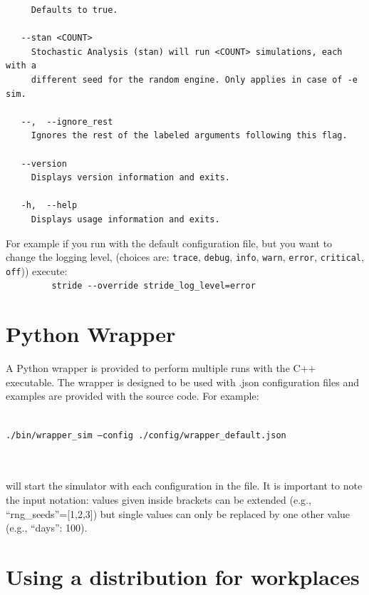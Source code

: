 \begin{verbatim}
     Defaults to true.
 
   --stan <COUNT>
     Stochastic Analysis (stan) will run <COUNT> simulations, each with a
     different seed for the random engine. Only applies in case of -e sim.
 
   --,  --ignore_rest
     Ignores the rest of the labeled arguments following this flag.
 
   --version
     Displays version information and exits.
 
   -h,  --help
     Displays usage information and exits.

\end{verbatim}

For example if you run with the default configuration file, but you
want to change the logging level,
(choices are: \texttt{trace}, \texttt{debug}, \texttt{info}, \texttt{warn},
\texttt{error}, \texttt{critical}, \texttt{off})) execute:\\
\verb!         stride --override stride_log_level=error!


\section{Python Wrapper}
A Python wrapper is provided to perform multiple runs with the C++ executable.
The wrapper is designed to be used with .json configuration files and examples are provided with the source code.
For example: \\ \\
\centerline{\texttt{./bin/wrapper\_sim --config ./config/wrapper\_default.json}} \\ \\
will start the simulator with each configuration in the file.
It is important to note the input notation: values given inside brackets can be extended (e.g., ``rng\_seeds''=[1,2,3]) but single values can only be replaced by one other value (e.g., ``days'': 100).

\section{Using a distribution for workplaces}	


